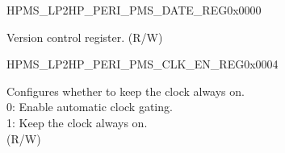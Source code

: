 \begin{register}{H}{PMS\_LP2HP\_PERI\_PMS\_DATE\_REG}{0x0000}\label{regdesc:PMSLP2HPPERIPMSDATEREG}
%
\regnewline%
\begin{regdesc}\begin{reglist}
\label{fielddesc:PMSLP2HPPERIPMSDATE}\item [PMS\_LP2HP\_PERI\_PMS\_DATE] Version control register. (R/W)
\end{reglist}\end{regdesc}
\end{register}


\begin{register}{H}{PMS\_LP2HP\_PERI\_PMS\_CLK\_EN\_REG}{0x0004}\label{regdesc:PMSLP2HPPERIPMSCLKENREG}
%
%
\regnewline%
\begin{regdesc}\begin{reglist}
\label{fielddesc:PMSLP2HPPERIPMSCLKEN}\item [PMS\_LP2HP\_PERI\_PMS\_CLK\_EN] Configures whether to keep the clock always on.\\
0: Enable automatic clock gating.\\
1: Keep the clock always on.\\ (R/W)
\end{reglist}\end{regdesc}
\end{register}


